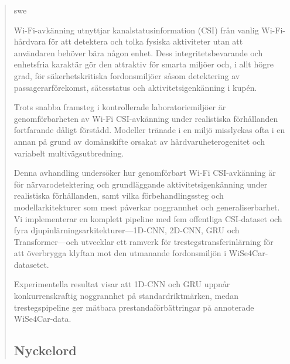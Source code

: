 \documentclass[english,bibtex]{kththesis}
\begin{document}
\begin{abstract}
  \markboth{\abstractname}{}
\begin{scontents}[store-env=lang]
swe
\end{scontents}
\begin{scontents}[store-env=abstracts,print-env=true]
Wi-Fi-avkänning utnyttjar kanalstatusinformation (CSI) från vanlig Wi-Fi-hårdvara för att detektera och tolka fysiska aktiviteter utan att användaren behöver bära någon enhet. Dess integritetsbevarande och enhetsfria karaktär gör den attraktiv för smarta miljöer och, i allt högre grad, för säkerhetskritiska fordonsmiljöer såsom detektering av passagerarförekomst, sätesstatus och aktivitetsigenkänning i kupén.

Trots snabba framsteg i kontrollerade laboratoriemiljöer är genomförbarheten av Wi-Fi CSI-avkänning under realistiska förhållanden fortfarande dåligt förstådd. Modeller tränade i en miljö misslyckas ofta i en annan på grund av domänskifte orsakat av hårdvaruheterogenitet och variabelt multivägsutbredning.

Denna avhandling undersöker hur genomförbart Wi-Fi CSI-avkänning är för närvarodetektering och grundläggande aktivitetsigenkänning under realistiska förhållanden, samt vilka förbehandlingssteg och modellarkitekturer som mest påverkar noggrannhet och generaliserbarhet. Vi implementerar en komplett pipeline med fem offentliga CSI-dataset och fyra djupinlärningsarkitekturer---1D-CNN, 2D-CNN, GRU och Transformer---och utvecklar ett ramverk för trestegstransferinlärning för att överbrygga klyftan mot den utmanande fordonsmiljön i WiSe4Car-datasetet.

Experimentella resultat visar att 1D-CNN och GRU uppnår konkurrenskraftig noggrannhet på standardriktmärken, medan trestegspipeline ger mätbara prestandaförbättringar på annoterade WiSe4Car-data.
\end{scontents}
\subsection*{Nyckelord}
\begin{scontents}[store-env=keywords,print-env=true]
\end{scontents}
\end{abstract}
\cleardoublepage
{}
\end{document}
